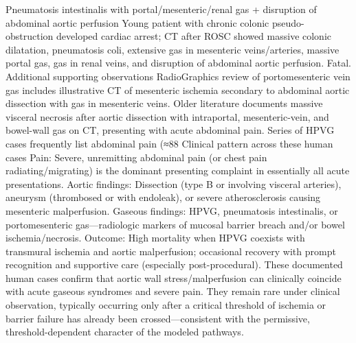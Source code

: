 Pneumatosis intestinalis with portal/mesenteric/renal gas + disruption of abdominal aortic perfusion
Young patient with chronic colonic pseudo-obstruction developed cardiac arrest; CT after ROSC showed massive colonic dilatation, pneumatosis coli, extensive gas in mesenteric veins/arteries, massive portal gas, gas in renal veins, and disruption of abdominal aortic perfusion. Fatal.
Additional supporting observations  
RadioGraphics review of portomesenteric vein gas includes illustrative CT of mesenteric ischemia secondary to abdominal aortic dissection with gas in mesenteric veins.  
Older literature documents massive visceral necrosis after aortic dissection with intraportal, mesenteric-vein, and bowel-wall gas on CT, presenting with acute abdominal pain.  
Series of HPVG cases frequently list abdominal pain (≈88 %
Clinical pattern across these human cases
Pain: Severe, unremitting abdominal pain (or chest pain radiating/migrating) is the dominant presenting complaint in essentially all acute presentations.  
Aortic findings: Dissection (type B or involving visceral arteries), aneurysm (thrombosed or with endoleak), or severe atherosclerosis causing mesenteric malperfusion.  
Gaseous findings: HPVG, pneumatosis intestinalis, or portomesenteric gas—radiologic markers of mucosal barrier breach and/or bowel ischemia/necrosis.  
Outcome: High mortality when HPVG coexists with transmural ischemia and aortic malperfusion; occasional recovery with prompt recognition and supportive care (especially post-procedural).
These documented human cases confirm that aortic wall stress/malperfusion can clinically coincide with acute gaseous syndromes and severe pain. They remain rare under clinical observation, typically occurring only after a critical threshold of ischemia or barrier failure has already been crossed—consistent with the permissive, threshold-dependent character of the modeled pathways.
